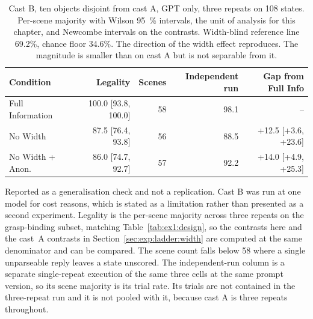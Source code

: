 \begin{table}[H]
  \centering
  \caption{Cast B, ten objects disjoint from cast A, GPT only, three repeats on 108 states. Per-scene majority with Wilson \SI{95}{\percent} intervals, the unit of analysis for this chapter, and Newcombe intervals on the contrasts. Width-blind reference line 69.2\%, chance floor 34.6\%. The direction of the width effect reproduces. The magnitude is smaller than on cast A but is not separable from it.}
  \label{tab:ex1:castb}
  \small
  \begin{tabular}{lrrrr}
    \toprule
    Condition & Legality & Scenes & Independent run & Gap from Full Info \\
    \midrule
    Full Information & 100.0 [93.8, 100.0] & 58 & 98.1 & -- \\
    No Width & 87.5 [76.4, 93.8] & 56 & 88.5 & +12.5 [+3.6, +23.6] \\
    No Width + Anon. & 86.0 [74.7, 92.7] & 57 & 92.2 & +14.0 [+4.9, +25.3] \\
    \bottomrule
  \end{tabular}
  \begin{minipage}{\linewidth}\vspace{2pt}\footnotesize Reported as a generalisation check and not a replication. Cast B was run at one model for cost reasons, which is stated as a limitation rather than presented as a second experiment. Legality is the per-scene majority across three repeats on the grasp-binding subset, matching Table~\ref{tab:ex1:design}, so the contrasts here and the cast~A contrasts in Section~\ref{sec:exp:ladder:width} are computed at the same denominator and can be compared. The scene count falls below \num{58} where a single unparseable reply leaves a state unscored. The independent-run column is a separate single-repeat execution of the same three cells at the same prompt version, so its scene majority is its trial rate. Its trials are not contained in the three-repeat run and it is not pooled with it, because cast A is three repeats throughout.\end{minipage}
\end{table}
